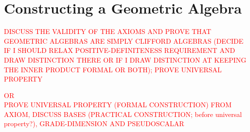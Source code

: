 \newpage

\section{Constructing a Geometric Algebra}

\textcolor{red}{DISCUSS THE VALIDITY OF THE AXIOMS AND PROVE THAT GEOMETRIC ALGEBRAS ARE SIMPLY CLIFFORD ALGEBRAS (DECIDE IF I SHOULD RELAX POSITIVE-DEFINITENESS REQUIREMENT AND DRAW DISTINCTION THERE OR IF I DRAW DISTINCTION AT KEEPING THE INNER PRODUCT FORMAL OR BOTH); PROVE UNIVERSAL PROPERTY}

\textcolor{red}{OR \\ PROVE UNIVERSAL PROPERTY (FORMAL CONSTRUCTION) FROM AXIOM, DISCUSS BASES (PRACTICAL CONSTRUCTION; before universal property?), GRADE-DIMENSION AND PSEUDOSCALAR}

